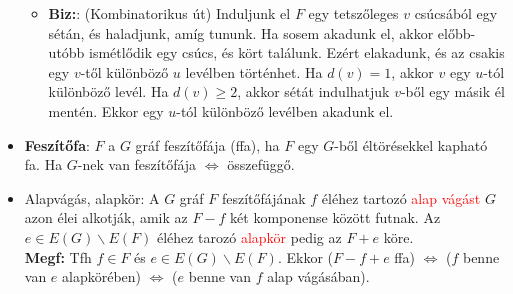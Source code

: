 \documentclass[../../szobeli.tex]{subfiles}
\begin{document}
\begin{itemize}
\begin{itemize}
            \item \textbf{Biz:}: (Kombinatorikus út) Induljunk el $F$ egy tetszőleges $v$ csúcsából egy sétán, és haladjunk, amíg tununk. Ha sosem akadunk el, akkor előbb-utóbb ismétlődik egy csúcs, és kört találunk. Ezért elakadunk, és az csakis egy $v$-től különböző $u$ levélben történhet. Ha $d(v)=1$, akkor $v$ egy $u$-tól különböző levél. Ha $d(v) \geq 2$, akkor sétát indulhatjuk $v$-ből egy másik él mentén. Ekkor egy $u$-tól különböző levélben akadunk el.
        \end{itemize}
        \item \textbf{Feszítőfa}: $F$ a $G$ gráf feszítőfája (ffa), ha $F$ egy $G$-ből éltörésekkel kapható fa. Ha $G$-nek van feszítőfája $\Leftrightarrow$ összefüggő.
        \item Alapvágás, alapkör: A $G$ gráf $F$ feszítőfájának $f$ éléhez tartozó \textcolor{red}{alap vágást} $G$ azon élei alkotják, amik az $F-f$ két komponense között futnak. Az $e \in E(G) \backslash E(F)$ éléhez tarozó \textcolor{red}{alapkör} pedig az $F+e$ köre. \\ \textbf{Megf:} Tfh $f \in F$ és $e \in E(G) \backslash E(F)$. Ekkor ($F-f+e$ ffa) $\Longleftrightarrow$ ($f$ benne van $e$ alapkörében) $\Longleftrightarrow$ ($e$ benne van $f$ alap vágásában).
    \end{itemize}
\end{document}
